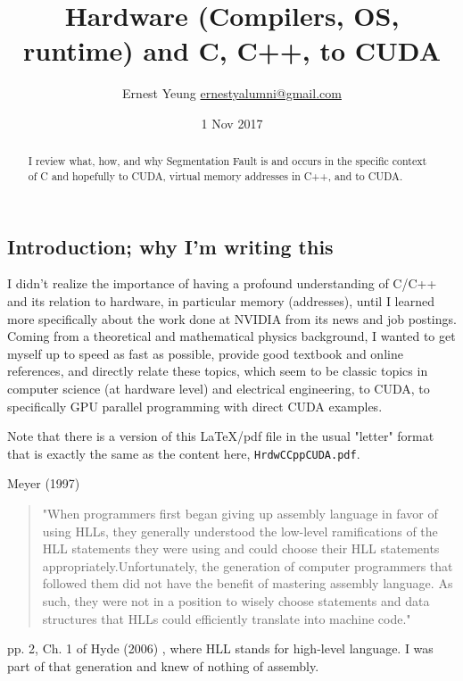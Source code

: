 \documentclass[10pt]{amsart}
\title[Hardware (Compilers, OS, runtime) and C, C++, to CUDA]{Hardware (Compilers, OS, runtime) and C, C++, to CUDA}
\author{Ernest Yeung \href{mailto:ernestyalumni@gmail.com}{ernestyalumni@gmail.com}}
\date{1 Nov 2017}
\begin{document}

\maketitle

\tableofcontents


\begin{multicols*}{2}

\begin{abstract}
I review what, how, and why Segmentation Fault is and occurs in the specific context of C and hopefully to CUDA, virtual memory addresses in C++, and to CUDA.  


\end{abstract}

\section{Introduction; why I'm writing this}  

I didn't realize the importance of having a profound understanding of C/C++ and its relation to hardware, in particular memory (addresses), until I learned more specifically about the work done at NVIDIA from its news and job postings.  Coming from a theoretical and mathematical physics background, I wanted to get myself up to speed as fast as possible, provide good textbook and online references, and directly relate these topics, which seem to be classic topics in computer science (at hardware level) and electrical engineering, to CUDA, to specifically GPU parallel programming with direct CUDA examples.  

Note that there is a version of this LaTeX/pdf file in the usual "letter" format that is exactly the same as the content here, \verb|HrdwCCppCUDA.pdf|.  

Meyer (1997) \cite{Meye1997}


\begin{quotation}
"When programmers first began giving up assembly language in favor of using HLLs, they generally understood the low-level ramifications of the HLL statements they were using and could choose their HLL statements appropriately.Unfortunately, the generation of computer programmers that followed them did not have the benefit of mastering assembly language. As such, they were not in a position to wisely choose statements and data structures that HLLs could efficiently translate into machine code."  
\end{quotation}
pp. 2, Ch. 1 of Hyde (2006) \cite{Hyde2006}, where HLL stands for high-level language.  I was part of that generation and knew of nothing of assembly.  


\end{multicols*}
\end{document}
